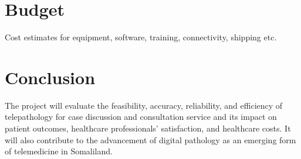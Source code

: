 \documentclass{article}
\begin{document}
\section{Budget}
Cost estimates for equipment, software, training, connectivity, shipping etc.

\section{Conclusion}
The project will evaluate the feasibility, accuracy, reliability, and efficiency of telepathology for case discussion and consultation service and its impact on patient outcomes, healthcare professionals’ satisfaction, and healthcare costs. It will also contribute to the advancement of digital pathology as an emerging form of telemedicine in Somaliland.



\end{document}
